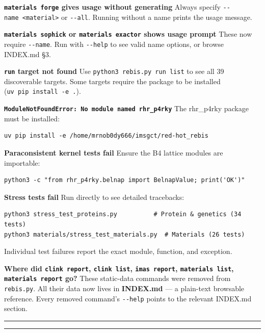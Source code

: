 \documentclass[12pt,a4paper]{article}
\begin{document}
\textbf{\texttt{materials\ forge} gives usage without generating} Always
specify \texttt{-\/-name\ \textless{}material\textgreater{}} or
\texttt{-\/-all}. Running without a name prints the usage message.

\textbf{\texttt{materials\ sophick} or \texttt{materials\ exactor} shows
usage prompt} These now require \texttt{-\/-name}. Run with
\texttt{-\/-help} to see valid name options, or browse INDEX.md §3.

\textbf{\texttt{run} target not found} Use
\texttt{python3\ rebis.py\ run\ list} to see all 39 discoverable
targets. Some targets require the package to be installed
(\texttt{uv\ pip\ install\ -e\ .}).

\textbf{\texttt{ModuleNotFoundError:\ No\ module\ named\ \textquotesingle{}rhr\_p4rky\textquotesingle{}}}
The rhr\_p4rky package must be installed:

\begin{verbatim}
uv pip install -e /home/mrnob0dy666/imsgct/red-hot_rebis
\end{verbatim}

\textbf{Paraconsistent kernel tests fail} Ensure the B4 lattice modules
are importable:

\begin{verbatim}
python3 -c "from rhr_p4rky.belnap import BelnapValue; print('OK')"
\end{verbatim}

\textbf{Stress tests fail} Run directly to see detailed tracebacks:

\begin{verbatim}
python3 stress_test_proteins.py          # Protein & genetics (34 tests)
python3 materials/stress_test_materials.py  # Materials (26 tests)
\end{verbatim}

Individual test failures report the exact module, function, and
exception.

\textbf{Where did \texttt{clink\ report}, \texttt{clink\ list},
\texttt{imas\ report}, \texttt{materials\ list},
\texttt{materials\ report} go?} These static-data commands were removed
from \texttt{rebis.py}. All their data now lives in \textbf{INDEX.md}
--- a plain-text browsable reference. Every removed command's
\texttt{-\/-help} points to the relevant INDEX.md section.

\begin{center}\rule{0.5\linewidth}{0.5pt}\end{center}

\begin{center}\rule{0.5\linewidth}{0.5pt}\end{center}
\end{document}
